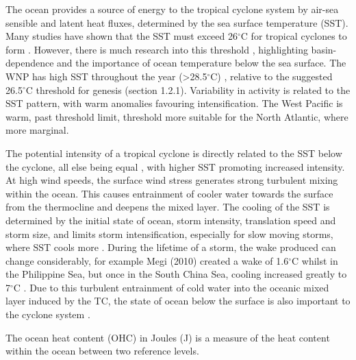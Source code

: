 The ocean provides a source of energy to the tropical cyclone system by air-sea sensible and latent heat fluxes, determined by the sea surface temperature (SST). Many studies have shown that the SST must exceed 26$^{\circ}$C for tropical cyclones to form \citep[e.g.][]{palmen1948formation}. However, there is much research into this threshold \citep[e.g.][]{dare2011threshold, mctaggart2015revisiting}, highlighting basin-dependence and the importance of ocean temperature below the sea surface. The WNP has high SST throughout the year (\textgreater 28.5$^{\circ}$C) \citep{chan2007interannual}, relative to the suggested 26.5$^{\circ}$C threshold for genesis (section 1.2.1). Variability in activity is related to the SST pattern, with warm anomalies favouring intensification. The West Pacific is warm, past threshold limit, threshold more suitable for the North Atlantic, where more marginal.

The potential intensity of a tropical cyclone is directly related to the SST below the cyclone, all else being equal \citep{emanuel1991theory, holland1997maximum}, with higher SST promoting increased intensity. At high wind speeds, the surface wind stress generates strong turbulent mixing within the ocean. This causes entrainment of cooler water towards the surface from the thermocline and deepens the mixed layer.  The cooling of the SST is determined by the initial state of ocean, storm intensity, translation speed and storm size, and limits storm intensification, especially for slow moving storms, where SST cools more \citep{bender1993numerical, bender2000real}. During the lifetime of a storm, the wake produced can change considerably, for example Megi (2010) created a wake of 1.6$^{\circ}$C whilst in the Philippine Sea, but once in the South China Sea, cooling increased greatly to 7$^{\circ}$C \citep{d2014impact}. Due to this turbulent entrainment of cold water into the oceanic mixed layer induced by the TC, the state of ocean below the surface is also important to the cyclone system \citep{bender2000real, shay2000effects}.

The ocean heat content (OHC) in Joules (J) is a measure of the heat content within the ocean between two reference levels. 


